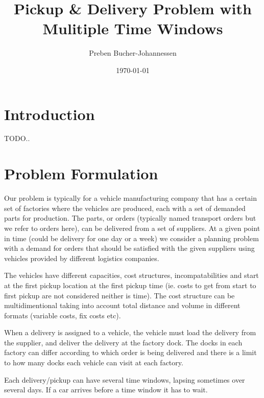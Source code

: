 \documentclass[a4paper,12pt]{article}
\begin{document}
\title{Pickup \& Delivery Problem with Mulitiple Time Windows}
\author{Preben Bucher-Johannessen}
\date{\today}
\maketitle

\tableofcontents
\newpage
{}

\section{Introduction}
TODO..

\section{Problem Formulation} \label{sec:PForm}
Our problem is typically for a vehicle manufacturing company that has a certain set of factories where the vehicles are produced, each with a set of demanded parts for production. The parts, or orders (typically named transport orders but we refer to orders here), can be delivered from a set of suppliers. At a given point in time (could be delivery for one day or a week) we consider a planning problem with a demand for orders that should be satisfied with the given suppliers using vehicles provided by different logistics companies. \par 
The vehicles have different capacities, cost structures, incompatabilities and start at the first pickup location at the first pickup time (ie. costs to get from start to first pickup are not considered neither is time). The cost structure can be multidimentional taking into account total distance and volume in different formats (variable costs, fix costs etc). \par
When a delivery is assigned to a vehicle, the vehicle must load the delivery from the supplier, and deliver the delivery at the factory dock. The docks in each factory can differ according to which order is being delivered and there is a limit to how many docks each vehicle can visit at each factory. \par
Each delivery/pickup can have several time windows, lapsing sometimes over several days. If a car arrives before a time window it has to wait. \par
\end{document}
